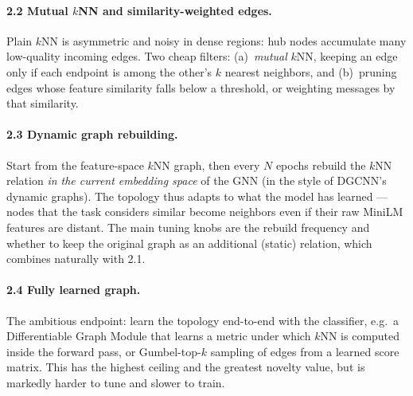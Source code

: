 \documentclass[11pt]{article}
\begin{document}
\paragraph{2.2 Mutual $k$NN and similarity-weighted edges.}
Plain $k$NN is asymmetric and noisy in dense regions: hub nodes accumulate many low-quality incoming edges. Two cheap filters: (a)~\emph{mutual} $k$NN, keeping an edge only if each endpoint is among the other's $k$ nearest neighbors, and (b)~pruning edges whose feature similarity falls below a threshold, or weighting messages by that similarity.

\paragraph{2.3 Dynamic graph rebuilding.}
Start from the feature-space $k$NN graph, then every $N$ epochs rebuild the $k$NN relation \emph{in the current embedding space} of the GNN (in the style of DGCNN's dynamic graphs). The topology thus adapts to what the model has learned --- nodes that the task considers similar become neighbors even if their raw MiniLM features are distant. The main tuning knobs are the rebuild frequency and whether to keep the original graph as an additional (static) relation, which combines naturally with 2.1.

\paragraph{2.4 Fully learned graph.}
The ambitious endpoint: learn the topology end-to-end with the classifier, e.g.\ a Differentiable Graph Module that learns a metric under which $k$NN is computed inside the forward pass, or Gumbel-top-$k$ sampling of edges from a learned score matrix. This has the highest ceiling and the greatest novelty value, but is markedly harder to tune and slower to train.
\end{document}
